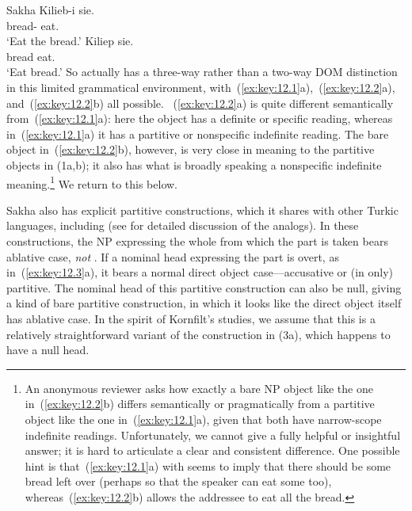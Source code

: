 \documentclass[output=paper]{langsci/langscibook}
\begin{document}
\ea\label{ex:key:12.2}Sakha
	\ea
		\gll Kilieb-i  sie.\\
			bread-\Acc{}  eat.\Imp{}\\
		\glt ‘Eat the bread.’
	\ex
		\gll Kiliep  sie.\\
			bread eat.\Imp{}\\
		\glt ‘Eat bread.’
	\z
\z
So  actually has a three-way rather than a two-way
\gls{DOM} distinction
in this limited grammatical environment, with~(\ref{ex:key:12.1}a),~(\ref{ex:key:12.2}a), and~(\ref{ex:key:12.2}b) all
possible. ~(\ref{ex:key:12.2}a) is quite different semantically from~(\ref{ex:key:12.1}a): here the object has
a definite or specific reading, whereas in~(\ref{ex:key:12.1}a) it has a partitive or
nonspecific indefinite reading. The bare object in~(\ref{ex:key:12.2}b), however, is very close
in meaning to the partitive objects in (1a,b); it also has what is broadly
speaking a nonspecific indefinite meaning.\footnote{An anonymous reviewer asks
    how exactly a bare NP object like the one in~(\ref{ex:key:12.2}b) differs semantically or
    pragmatically from a partitive object like the one in~(\ref{ex:key:12.1}a), given that both
    have narrow-scope indefinite readings.  Unfortunately, we cannot give a
    fully helpful or insightful answer; it is hard to articulate a clear and
    consistent difference.  One possible hint is that~(\ref{ex:key:12.1}a) with 
    seems to imply that there should be some bread left over (perhaps so that
    the speaker can eat some too), whereas~(\ref{ex:key:12.2}b) allows the addressee to eat all
the bread.}  We return to this below.

Sakha also has explicit partitive constructions, which it shares with other
Turkic languages, including  (see
\citealt{Kornfilt1990,Kornfilt1996} for
detailed discussion of the  analogs). In these constructions, the
NP expressing the whole from which the part is taken bears ablative case,
\emph{not} . If a nominal head expressing the part is
overt, as in~(\ref{ex:key:12.3}a), it bears a normal direct object
case—accusative or (in  only) partitive. The nominal head of
this partitive construction can also be null, giving a kind of bare partitive
construction, in which it looks like the direct object itself has ablative
case. In the spirit of Kornfilt’s studies, we assume that this is a relatively
straightforward variant of the construction in (3a), which happens to have a
null head.
\end{document}
